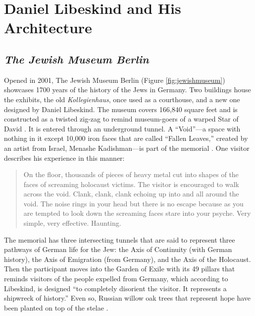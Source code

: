 \section{Daniel Libeskind and His Architecture}

\subsection{\textit{The Jewish Museum Berlin}}


Opened in 2001, The Jewish Museum Berlin (Figure \ref{fig:jewishmuseum}) showcases 1700
years of the history of the Jews in Germany.  Two buildings house the
exhibits, the old \textit{Kollegienhaus}, once used as a courthouse,
and a new one designed by Daniel Libeskind.  The museum covers 166,840
square feet \citep{libeskind2011} and is constructed as a twisted zig-zag
to remind museum-goers of a warped Star of David \citep{muellerkroll2011}.  It
is entered through an underground tunnel.  A
``Void''---a space with nothing in it except
10,000 iron faces that are called ``Fallen Leaves,'' created by
an artist from Israel,
Menashe Kadishman---is part of the memorial \citep{berlin2012}.
One visitor describes his experience in this manner:

\begin{quote}
On the floor, thousands of pieces of heavy metal cut
into shapes of the faces of screaming holocaust victims.  The visitor
is encouraged to walk across the void.  Clank, clank, clank echoing up
into and all around the void.  The noise rings in your head but there
is no escape because as you are tempted to look down the screaming
faces stare into your psyche.  Very simple, very effective.  Haunting. \citep{gold2004}
\end{quote}

The memorial has three intersecting tunnels that are said to represent
three pathways of German life for the Jew: the Axis of Continuity (with
German history), the Axis of Emigration (from
Germany), and the Axis of the Holocaust.  Then the participant moves
into the Garden of Exile with its 49 pillars that reminds visitors of
the people expelled from Germany, which according to Libeskind, is
designed ``to completely disorient the visitor.  It
represents a shipwreck of history.''  Even so, Russian
willow oak trees that represent hope have been planted on top of the
stelae \citep{berlin2012c}.

